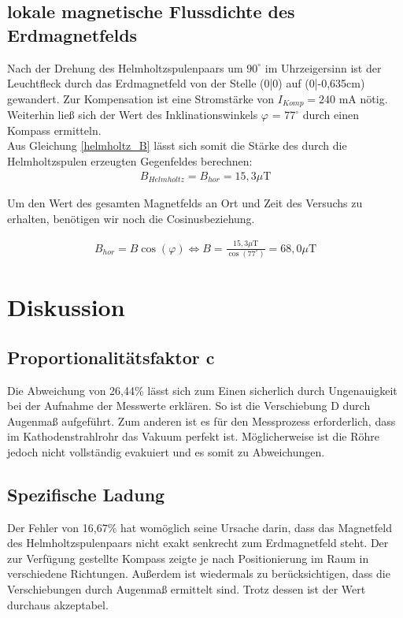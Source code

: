 \subsection{lokale magnetische Flussdichte des Erdmagnetfelds}
Nach der Drehung des Helmholtzspulenpaars um $90^\circ$ im Uhrzeigersinn ist der Leuchtfleck durch das Erdmagnetfeld
von der Stelle (0|0) auf (0|-0,635cm) gewandert. Zur Kompensation ist eine Stromstärke von $I_{Komp} = 240$ mA nötig.
Weiterhin ließ sich der Wert des Inklinationswinkels $\varphi$ = $77^\circ$ durch einen Kompass ermitteln.\\
Aus Gleichung \eqref{helmholtz_B} lässt sich somit die Stärke des durch die Helmholtzspulen erzeugten Gegenfeldes berechnen:
\begin{align}
 \nonumber
 B_{Helmholtz} = B_{hor}= 15,3 \mu\text{T}
 \end{align}
 
Um den Wert des gesamten Magnetfelds an Ort und Zeit des Versuchs zu erhalten, benötigen wir noch die Cosinusbeziehung.

\begin{align}
 B_{hor} = B \cos(\varphi) \Leftrightarrow B = \frac{15,3 \mu\text{T}}{\cos(77^\circ)} = 68,0 \mu\text{T}
\end{align}

\section{Diskussion}
\subsection{Proportionalitätsfaktor c}
Die Abweichung von 26,44\% lässt sich zum Einen sicherlich durch Ungenauigkeit bei der Aufnahme der Messwerte erklären.
So ist die Verschiebung D durch Augenmaß aufgeführt. Zum anderen ist es für den Messprozess erforderlich, dass im Kathodenstrahlrohr das Vakuum perfekt ist. Möglicherweise ist die Röhre jedoch nicht vollständig evakuiert und es somit zu Abweichungen.
\subsection{Spezifische Ladung}
Der Fehler von 16,67\% hat womöglich seine Ursache darin, dass das Magnetfeld des Helmholtzspulenpaars nicht exakt senkrecht
zum Erdmagnetfeld steht. Der zur Verfügung gestellte Kompass zeigte je nach Positionierung im Raum in verschiedene Richtungen.
Außerdem ist wiedermals zu berücksichtigen, dass die Verschiebungen durch Augenmaß ermittelt sind. Trotz dessen ist der Wert
durchaus akzeptabel.
